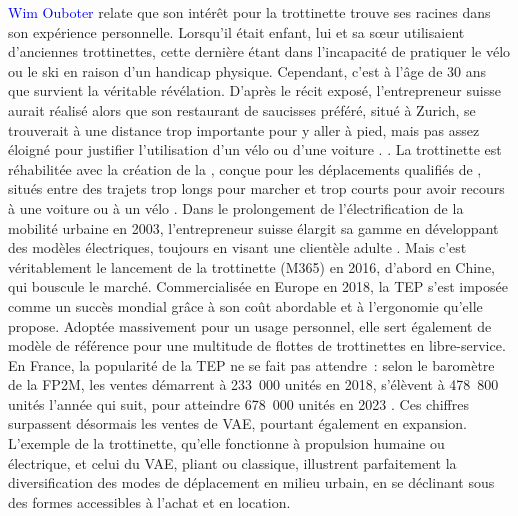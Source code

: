 \begin{refsegment}
{    \textcolor{blue}{Wim Ouboter} relate que son intérêt pour la trottinette trouve ses racines dans son expérience personnelle. Lorsqu’il était enfant, lui et sa sœur utilisaient d’anciennes trottinettes, cette dernière étant dans l’incapacité de pratiquer le vélo ou le ski en raison d’un handicap physique. Cependant, c’est à l’âge de 30 ans que survient la véritable révélation. D'après le récit exposé, l'entrepreneur suisse aurait réalisé alors que son restaurant de saucisses préféré, situé à Zurich, se trouverait à une distance trop importante pour y aller à pied, mais pas assez éloigné pour justifier l’utilisation d’un vélo ou d’une voiture \textcolor{blue}{\autocite{ma_trott_histoire_2020}}.
} \textcolor{blue}{\autocite{ma_trott_histoire_2020}}. La trottinette est réhabilitée avec la création de la , conçue pour les déplacements qualifiés de , situés entre des trajets trop longs pour marcher et trop courts pour avoir recours à une voiture ou à un vélo \textcolor{blue}{\autocite{oconnell_travel_2002}}. Dans le prolongement de l’électrification de la mobilité urbaine en 2003, l’entrepreneur suisse élargit sa gamme en développant des modèles électriques, toujours en visant une clientèle adulte \textcolor{blue}{\autocite{ma_trott_histoire_2020}}. Mais c’est véritablement le lancement de la trottinette  (M365) en 2016, d'abord en Chine, qui bouscule le marché. Commercialisée en Europe en 2018, la \acrshort{TEP} s’est imposée comme un succès mondial grâce à son coût abordable et à l'ergonomie qu'elle propose. Adoptée massivement pour un usage personnel, elle sert également de modèle de référence pour une multitude de flottes de trottinettes en libre-service. En France, la popularité de la \acrshort{TEP} ne se fait pas attendre~: selon le baromètre de la \acrfull{FP2M}, les ventes démarrent à 233~000 unités en 2018, s'élèvent à 478~800 unités l'année qui suit, pour atteindre 678~000 unités en 2023 \textcolor{blue}{\autocites[1]{fp2m_barometre_2021}[1]{fp2m_ventes_2023}}. Ces chiffres surpassent désormais les ventes de \acrshort{VAE}, pourtant également en expansion. L’exemple de la trottinette, qu’elle fonctionne à propulsion humaine ou électrique, et celui du \acrshort{VAE}, pliant ou classique, illustrent parfaitement la diversification des modes de déplacement en milieu urbain, en se déclinant sous des formes accessibles à l'achat et en location.%


\end{refsegment}
